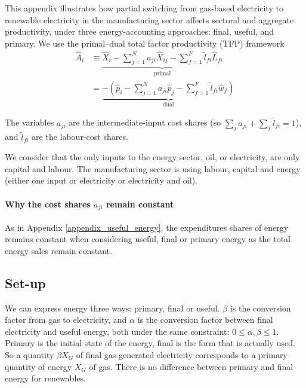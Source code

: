 \documentclass[11pt]{article}
\begin{document}
This appendix illustrates how partial switching from gas-based electricity to renewable electricity in the manufacturing sector affects sectoral and aggregate productivity, under three energy-accounting approaches: final, useful, and primary.  We use the primal--dual total factor productivity (TFP) framework
\begin{subequations}
\begin{align}
\hat{A}_i  &\equiv  
\underbrace{\hat{X}_i  -  \sum_{j=1}^N a_{ji} \hat{X}_{ij}  -  \sum_{f=1}^F \tilde{l}_{fi} \hat{L}_{fi}}_{\text{primal}}
\label{eq:primal_appendix}\\
 &= 
\underbrace{-\left( \hat{p}_i  -  \sum_{j=1}^N a_{ji} \hat{p}_j  -  \sum_{f=1}^F \tilde{l}_{fi} \hat{w}_f \right)}_{\text{dual}}
\label{eq:dual_appendix}
\end{align}
\end{subequations}

\noindent The variables $a_{ji}$ are the intermediate-input cost shares (so $\sum_j a_{ji} + \sum_f \tilde{l}_{fi}=1$), and $\tilde{l}_{fi}$ are the labour-cost shares.

We consider that the only inputs to the energy sector, oil, or electricity, are only capital and labour. The manufacturing sector is using labour, capital and energy (either one input or electricity or electricity and oil).

\tableofcontents


\paragraph{Why the cost shares $a_{ji}$ remain constant}

As in Appendix \ref{appendix_useful_energy}, the expenditures shares of energy remains constant when considering useful, final or primary energy as the total energy sales remain constant.

\subsection{Set-up}

We can express energy three ways: primary, final or useful. $\beta$ is the conversion factor from gas to electricity, and $\alpha$ is the conversion factor between final electricity and useful energy,  both under the same constraint: $0 \leq \alpha, \beta\leq 1$. Primary is the initial state of the energy, final is the form that is actually used. So a quantity $\beta X_G$ of final gas-generated electricity corresponds to a primary quantity of energy $X_G$ of gas. There is no difference between primary and final energy for renewables. 
\end{document}
